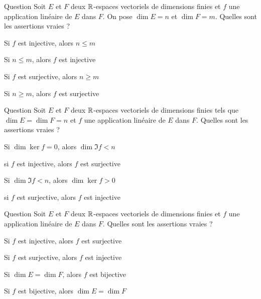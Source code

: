 \begin{multi}[multiple,feedback=
{On a : \(\dim Im f \le \dim F=m\).
\vskip0mm
Du théorème du rang, on déduit que si \(n>m\),  \(\dim \ker f >0\) et donc \(f\) n'est pas injective et que si \(n<m\),  \(\dim \Im f <m\) et donc \(f\) n'est pas surjective.
\vskip0mm
Si \(n\le m\), alors \(f\) n'est pas nécessairement injective et si \(n \ge m\), alors \(f\) n'est pas nécessairement surjective. Exemple : L'application nulle de  \(\Rr\) dans \(\Rr\).
}]{Question}
Soit \(E\) et \(F\) deux \(\Rr\)-espaces vectoriels de dimensions finies et \(f\) une application linéaire de \(E\) dans \(F\). On pose \(\dim E=n \) et \(\dim F=m\). Quelles sont les assertions vraies ?

    \item* Si \(f\) est injective, alors \(n \le m\)
    \item Si \(n \le m\), alors \(f\) est injective
    \item* Si \(f\) est surjective, alors \(n \ge m\)
    \item Si \(n \ge m\), alors \(f\) est surjective
\end{multi}


\begin{multi}[multiple,feedback=
{Du théorème du rang, on déduit que \(f\) est bijective si, et seulement si, \(f\) est injective ou surjective.
}]{Question}
Soit \(E\) et \(F\) deux \(\Rr\)-espaces vectoriels de  dimensions finies tels que \(\dim E= \dim F=n\) et \(f\) une application linéaire de \(E\) dans \(F\). Quelles sont les assertions vraies ?

    \item Si \(\dim \ker f =0\), alors \(\dim \Im f <n\)
    \item* si \(f\) est injective, alors \(f\) est surjective
    \item* Si \(\dim \Im f <n\), alors \(\dim \ker f >0\)
    \item* si \(f\) est surjective, alors \(f\) est injective
\end{multi}


\begin{multi}[multiple,feedback=
{Si \(\dim E \neq \dim F\), alors \(f\) peut-être injective (resp. surjective) sans qu'elle soit surjective (resp. injective).
\vskip0mm
Si \(\dim E = \dim F\), \(f\) n'est pas nécessairement bijective.
\vskip0mm
Par contre, si  \(f\) est bijective, comme  \(E\) et \(F\) sont deux \(\Rr\)-espaces vectoriels de  dimensions finies, du théorème du rang, on déduit que \(\dim E = \dim F\).
}]{Question}
Soit \(E\) et \(F\) deux \(\Rr\)-espaces vectoriels de dimensions finies   
et \(f\) une application linéaire de \(E\) dans \(F\). Quelles sont les assertions vraies ?

    \item Si \(f\) est injective, alors \(f\) est surjective
    \item Si \(f\) est surjective, alors \(f\) est injective
    \item Si \(\dim E = \dim F\), alors \(f\) est bijective
    \item* Si \(f\) est bijective, alors \(\dim E = \dim F\)
\end{multi}


